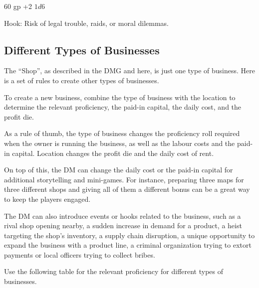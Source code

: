 \documentclass[twocolumn]{dndbook}
\begin{document}

\begin{DndComment}[color=bgtan2018]{}
	\hfill 60 gp
	\hfill +2
	\hfill $1d6$
\end{DndComment}

Hook: Risk of legal trouble, raids, or moral dilemmas.\par

\subsection{Different Types of Businesses}

The ``Shop'', as described in the DMG and here, is just one type of business.
Here is a set of rules to create other types of businesses.

\begin{emphasisParagraph}
	To create a new business, combine the type of business with the location to determine
	the relevant proficiency, the paid-in capital, the daily cost,
	and the profit die.
\end{emphasisParagraph}

As a rule of thumb, the type of business changes the proficiency roll required when the owner is running the business,
as well as the labour costs and the paid-in capital.
Location changes the profit die and the daily cost of rent.\par

On top of this, the DM can change the daily cost or the paid-in capital for additional storytelling and mini-games.
For instance, preparing three maps for three different shops and
giving all of them a different bonus can be a great way to keep the
players engaged.\par

The DM can also introduce events or hooks related to the business,
such as a rival shop opening nearby, a sudden increase in demand for a product,
a heist targeting the shop's inventory, a supply chain disruption,
a unique opportunity to expand the business with a product line,
a criminal organization trying to extort payments or local officers
trying to collect bribes.\par

Use the following table for the relevant proficiency for different types of businesses.
\end{document}
